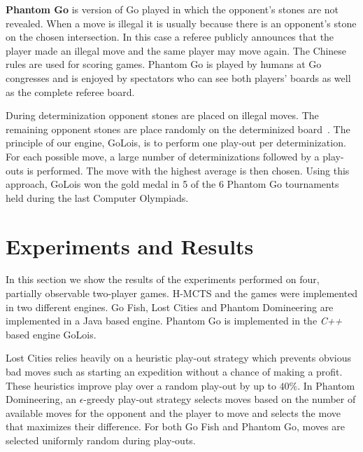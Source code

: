 \documentclass[a4paper]{llncs}
\begin{document}
{\sc \bf Phantom Go} is version of Go played in which the opponent's stones are not revealed. When a move is illegal it is usually because there is an opponent's stone on the chosen intersection. In this case a referee publicly announces that the player made an illegal move and the same player may move again. The Chinese rules are used for scoring games. Phantom Go is played by humans at Go congresses and is enjoyed by spectators who can see both players' boards as well as the complete referee board.

During determinization opponent stones are placed on illegal moves. The remaining opponent stones are place randomly on the determinized board~\cite{cazenave06}. The principle of our engine, {\sc GoLois}, is to perform one play-out per determinization. For each possible move, a large number of determinizations followed by a play-outs is performed. The move with the highest average is then chosen. Using this approach, {\sc GoLois} won the gold medal in 5 of the 6 Phantom Go tournaments held during the last Computer Olympiads.

\section{Experiments and Results}
\label{sec:exp_res}
In this section we show the results of the experiments performed on four, partially observable two-player games. H-MCTS and the games were implemented in two different engines. Go Fish, Lost Cities and Phantom Domineering are implemented in a Java based engine. Phantom Go is implemented in the \emph{C++} based engine {\sc GoLois}.

Lost Cities relies heavily on a heuristic play-out strategy which prevents obvious bad moves such as starting an expedition without a chance of making a profit. These heuristics improve play over a random play-out by up to $40\%$. In Phantom Domineering, an $\epsilon$-greedy play-out strategy selects moves based on the number of available moves for the opponent and the player to move and selects the move that maximizes their difference. For both Go Fish and Phantom Go, moves are selected uniformly random during play-outs.
\end{document}
